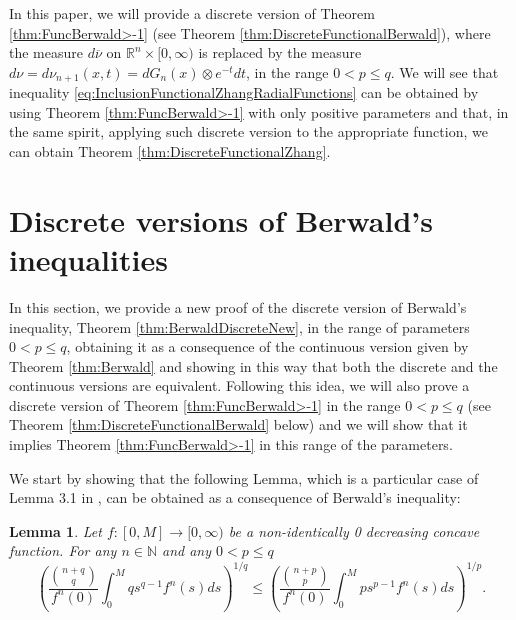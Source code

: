 \documentclass{amsart}
\newcommand{\R}{\mathbb R}
\newcommand{\N}{\mathbb N}
\newtheorem{lemma}{Lemma}[section]
\theoremstyle{remark}
\theoremstyle{definition}
\numberwithin{equation}{section}
\begin{document}
In this paper, we will provide a discrete version of Theorem \ref{thm:FuncBerwald>-1} (see Theorem \ref{thm:DiscreteFunctionalBerwald}), where the measure $d\overline{\nu}$ on $\R^n\times[0,\infty)$ is replaced by the measure $d\nu=d\nu_{n+1}(x,t)= dG_n(x) \otimes e^{-t}dt$, in the range $0<p\leq q$. We will see that inequality \eqref{eq:InclusionFunctionalZhangRadialFunctions} can be obtained by using Theorem \ref{thm:FuncBerwald>-1} with only positive parameters and that, in the same spirit, applying such discrete version to the appropriate function, we can obtain Theorem \ref{thm:DiscreteFunctionalZhang}.


\section{Discrete versions of Berwald's inequalities}\label{sec:Discrete Berwald's inequalities}

In this section, we provide a new proof of the discrete version of Berwald's inequality, Theorem \ref{thm:BerwaldDiscreteNew}, in the range of parameters $0<p\leq q$,  obtaining it as a consequence of the continuous version given by Theorem \ref{thm:Berwald} and showing in this way that both the discrete and the continuous versions are equivalent. Following this idea, we will also prove a discrete version of Theorem \ref{thm:FuncBerwald>-1} in the range $0<p\leq q$ (see Theorem \ref{thm:DiscreteFunctionalBerwald} below) and we will show that it implies Theorem \ref{thm:FuncBerwald>-1} in this range of the parameters.

We start by showing that the following Lemma, which is a particular case of Lemma 3.1 in \cite{Ma}, can be obtained as a consequence of Berwald's inequality:

\begin{lemma}\label{lem:LemmaBerwald}
Let $f:[0,M] \to [0, \infty)$ be a non-identically 0 decreasing concave function. For any $n \in \N$ and any $0<p\leq q$
$$
\left( \frac{\binom{n+q}{q}}{f^n(0)} \int_0^M q s^{q-1} f^n(s) ds  \right)^{1/q} \leq \left( \frac{\binom{n+p}{p}}{f^n(0)} \int_0^M p s^{p-1} f^n(s) ds \right)^{1/p}.
$$
\end{lemma}
\end{document}
